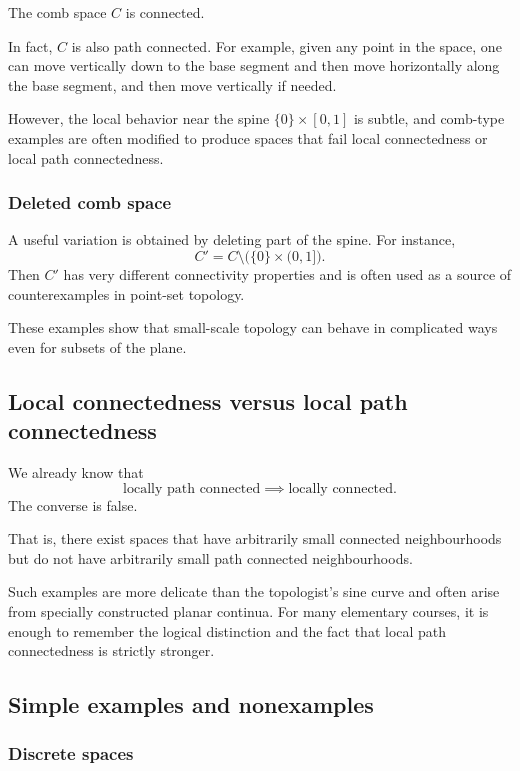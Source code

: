 \documentclass[12pt,a4paper]{article}
\theoremstyle{notespace}
\begin{document}
The comb space \(C\) is connected.

In fact, \(C\) is also path connected. For example, given any point in the space, one can move vertically down to the base segment and then move horizontally along the base segment, and then move vertically if needed.

However, the local behavior near the spine \(\{0\}\times[0,1]\) is subtle, and comb-type examples are often modified to produce spaces that fail local connectedness or local path connectedness.

\subsubsection{Deleted comb space}

A useful variation is obtained by deleting part of the spine. For instance,
\[
C'
=
C\setminus \bigl(\{0\}\times(0,1]\bigr).
\]
Then \(C'\) has very different connectivity properties and is often used as a source of counterexamples in point-set topology.

These examples show that small-scale topology can behave in complicated ways even for subsets of the plane.

\subsection{Local connectedness versus local path connectedness}

We already know that
\[
\text{locally path connected} \implies \text{locally connected}.
\]
The converse is false.

That is, there exist spaces that have arbitrarily small connected neighbourhoods but do not have arbitrarily small path connected neighbourhoods.

Such examples are more delicate than the topologist's sine curve and often arise from specially constructed planar continua. For many elementary courses, it is enough to remember the logical distinction and the fact that local path connectedness is strictly stronger.

\subsection{Simple examples and nonexamples}

\subsubsection{Discrete spaces}
\end{document}
